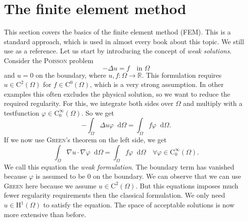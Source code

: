 \documentclass[12pt,a4paper,twoside, open=right]{scrreprt}
\theoremstyle{definition}
\theoremstyle{plain}
\newcommand{\rr}{\mathbb{R}}
\newcommand{\D}{\mathop{}\!\mathrm{d}}
\begin{document}
\section{The finite element method}
\label{sec:fem}
This section covers the basics of the finite element method (FEM). This is a standard approach, which is used in almost every book about this topic. We still use \cite{Ganesan2017} as a reference.
Let us start by introducing the concept of \emph{weak solutions}. Consider the \textsc{Poisson} problem
\begin{equation}
    -\Delta u = f \quad \text{in }\Omega
\end{equation}
and $u=0$ on the boundary, where $u,f\colon \Omega\to\rr$. This formulation requires $u\in \mathrm{C}^2(\Omega)$ for $f\in\mathrm{C}^0(\Omega)$, which is a very strong assumption. In other examples this often excludes the physical solution, so we want to reduce the required regularity. For this, we integrate both sides over $\Omega$ and multiply with a testfunction $\varphi\in \mathrm{C}^\infty_0(\Omega)$. So we get
\begin{equation}
    -\int_\Omega \Delta u\varphi\D\Omega =\int_\Omega f\varphi\D\Omega.
\end{equation}
If we now use \textsc{Green}'s theorem on the left side, we get
\begin{equation}
    \int_\Omega \nabla u\cdot\nabla \varphi\D\Omega = \int_\Omega f\varphi\D\Omega \quad\forall\varphi\in \mathrm{C}^\infty_0(\Omega)\label{eq:laplace}.
\end{equation}
We call this equation the \emph{weak formulation}.
The boundary term has vanished because $\varphi$ is assumed to be 0 on the boundary.
We can observe that we can use \textsc{Green} here because we assume $u\in \mathrm{C}^2(\Omega)$. But this equations imposes much fewer regularity requirements then the classical formulation. We only need $u\in\mathrm{H}^1(\Omega)$ to satisfy the equation. The space of acceptable solutions is now more extensive than before.
\end{document}

